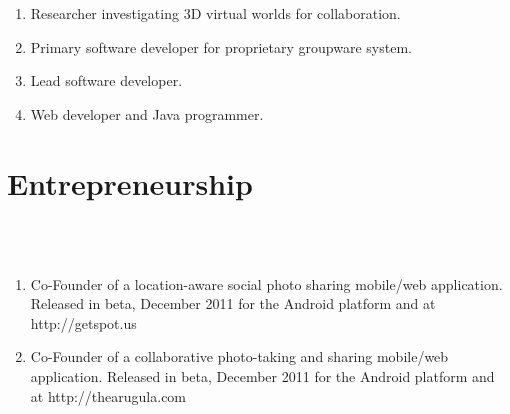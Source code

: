 \documentclass[line]{res}
\begin{document}
\begin{resume}
\begin{enumerate}
		\item {} 
		\begin{position}
			Researcher investigating 3D virtual worlds for collaboration. 
		\end{position}
		
		\item {} 
		\begin{position}
			Primary software developer for proprietary groupware system. 
		\end{position}
		
		\item {} 
		\begin{position}
			Lead software developer. 
		\end{position}
		
		\item {} 
		\begin{position}
			Web developer and Java programmer. 
		\end{position}
	\end{enumerate}
	
	
	\section{\sc Entrepreneurship}
	\begin{format}
		\\
		\body\\
	\end{format}
	\begin{enumerate}
		\item {}
		\begin{position}
			Co-Founder of a location-aware social photo sharing mobile/web application. Released
      in beta, December 2011 for the Android platform and at http://getspot.us
		\end{position}
		
		\item {}
		\begin{position}
			Co-Founder of a collaborative photo-taking and sharing mobile/web
      application. Released in beta, December 2011 for the Android platform and at
      http://thearugula.com
		\end{position}
		

\end{enumerate}
\end{resume}
\end{document}
